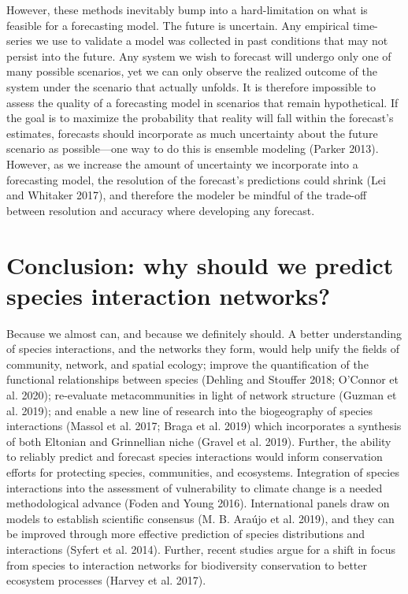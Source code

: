 \documentclass[10pt,oneside]{article}
\begin{document}
However, these methods inevitably bump into a hard-limitation on what is
feasible for a forecasting model. The future is uncertain. Any empirical
time-series we use to validate a model was collected in past conditions
that may not persist into the future. Any system we wish to forecast
will undergo only one of many possible scenarios, yet we can only
observe the realized outcome of the system under the scenario that
actually unfolds. It is therefore impossible to assess the quality of a
forecasting model in scenarios that remain hypothetical. If the goal is
to maximize the probability that reality will fall within the forecast's
estimates, forecasts should incorporate as much uncertainty about the
future scenario as possible---one way to do this is ensemble modeling
(Parker 2013). However, as we increase the amount of uncertainty we
incorporate into a forecasting model, the resolution of the forecast's
predictions could shrink (Lei and Whitaker 2017), and therefore the
modeler be mindful of the trade-off between resolution and accuracy
where developing any forecast.

\hypertarget{conclusion-why-should-we-predict-species-interaction-networks}{%
\section{Conclusion: why should we predict species interaction
networks?}\label{conclusion-why-should-we-predict-species-interaction-networks}}

Because we almost can, and because we definitely should. A better
understanding of species interactions, and the networks they form, would
help unify the fields of community, network, and spatial ecology;
improve the quantification of the functional relationships between
species (Dehling and Stouffer 2018; O'Connor et al. 2020); re-evaluate
metacommunities in light of network structure (Guzman et al. 2019); and
enable a new line of research into the biogeography of species
interactions (Massol et al. 2017; Braga et al. 2019) which incorporates
a synthesis of both Eltonian and Grinnellian niche (Gravel et al. 2019).
Further, the ability to reliably predict and forecast species
interactions would inform conservation efforts for protecting species,
communities, and ecosystems. Integration of species interactions into
the assessment of vulnerability to climate change is a needed
methodological advance (Foden and Young 2016). International panels draw
on models to establish scientific consensus (M. B. Araújo et al. 2019),
and they can be improved through more effective prediction of species
distributions and interactions (Syfert et al. 2014). Further, recent
studies argue for a shift in focus from species to interaction networks
for biodiversity conservation to better ecosystem processes (Harvey et
al. 2017).
\end{document}
